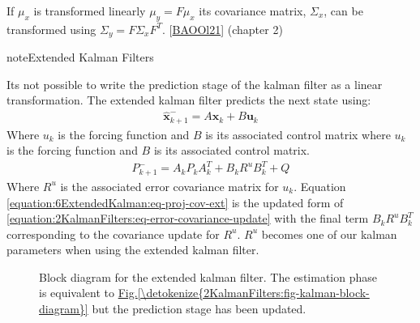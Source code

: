 \documentclass[letterpaper,10pt,english]{jupyterBook}
\begin{document}
\begin{sphinxShadowBox}
\sphinxstylesidebartitle{}

\sphinxAtStartPar
If \(\mu_x\) is transformed linearly \(\mu_y = F\mu_x\) its covariance matrix, \(\Sigma_x\), can be transformed using \(\Sigma_y = F\Sigma_xF^T\). {[}\hyperlink{cite.99Bibliography:id3}{BAOOl21}{]} (chapter 2)
\end{sphinxShadowBox}

\begin{sphinxadmonition}{note}{Extended Kalman Filters}

\sphinxAtStartPar
Its not possible to write the prediction stage of the kalman filter as a linear transformation. The extended kalman filter predicts the next state using:
\begin{equation}\label{equation:6ExtendedKalman:eq-proj-ext}
\begin{split}\hat{\boldsymbol{x}}^-_{k+1} = A\hat{\boldsymbol{x}}_k + B\boldsymbol{u}_k\end{split}
\end{equation}
\sphinxAtStartPar
Where \(u_k\) is the forcing function and \(B\) is its associated control matrix where \(u_k\) is the forcing function and \(B\) is its associated control matrix.
\begin{equation}\label{equation:6ExtendedKalman:eq-proj-cov-ext}
\begin{split}P^-_{k+1} = A_kP_kA_k^T+B_kR^uB_k^T+Q\end{split}
\end{equation}
\sphinxAtStartPar
Where \(R^u\) is the associated error covariance matrix for \(u_k\). Equation \eqref{equation:6ExtendedKalman:eq-proj-cov-ext} is the updated form of \eqref{equation:2KalmanFilters:eq-error-covariance-update} with the final term \(B_kR^uB_k^T\) corresponding to the covariance update for \(R^u\). \(R^u\) becomes one of our kalman parameters when using the extended kalman filter.

\begin{figure}[H]
\centering
\capstart

\noindent{}
\caption{Block diagram for the extended kalman filter. The estimation phase is equivalent to \hyperref[\detokenize{2KalmanFilters:fig-kalman-block-diagram}]{Fig.\@ \ref{\detokenize{2KalmanFilters:fig-kalman-block-diagram}}} but the prediction stage has been updated.}\label{\detokenize{6ExtendedKalman:fig-block-kalman}}\end{figure}
\end{sphinxadmonition}
\end{document}
